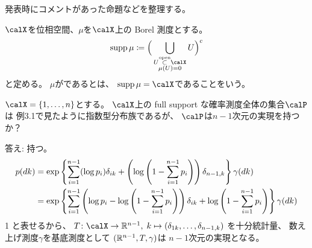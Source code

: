\documentclass[report]{jlreq}
\begin{document}
%

発表時にコメントがあった命題などを整理する。

\begin{definition}
    $\calX$を位相空間、$\mu$を$\calX$上の Borel 測度とする。
    \begin{equation}
        \supp\mu \coloneqq \Big(
            \bigcup_{\substack{U \opensubset \calX \\ \mu(U) = 0}} U
        \Big)^c
    \end{equation}
    と定める。
    $\mu$がであるとは、
    $\supp\mu = \calX$であることをいう。
\end{definition}

\begin{problem}
    $\calX = \{ 1, \dots, n \}$とする。
    $\calX$上の full support な確率測度全体の集合$\calP$は
    例3.1で見たように指数型分布族であるが、
    $\calP$は$n - 1$次元の実現を持つか？
\end{problem}

\begin{answer}
    答え: 持つ。
    \begin{alignat}{1}
        p(dk)
            &=
                \exp\left\{{
                    \sum_{i = 1}^{n - 1}
                        (\log p_i) \delta_{ik}
                    +
                    \left({
                        \log\left({
                            1 - \sum_{i = 1}^{n - 1} p_i
                        }\right)
                    }\right)
                    \delta_{n - 1, k}
                }\right\}
                \gamma(dk)
                \\
            &=
                \exp\left\{{
                    \sum_{i = 1}^{n - 1}
                        \left({
                            \log p_i
                            -
                            \log\left({
                                1 - \sum_{i = 1}^{n - 1} p_i
                            }\right)
                        }\right)
                        \delta_{ik}
                    +
                    \log\left({
                        1 - \sum_{i = 1}^{n - 1} p_i
                    }\right)
                }\right\}
                \gamma(dk)
    \end{alignat}{1}
    と表せるから、
    $T \colon \calX \to \R^{n - 1}, \;
        k \mapsto (\delta_{1k}, \dots, \delta_{n - 1, k})$
    を十分統計量、
    数え上げ測度$\gamma$を基底測度として
    $(\mathbb{R}^{n - 1}, T, \gamma)$は
    $n - 1$次元の実現となる。
\end{answer}
\end{document}
